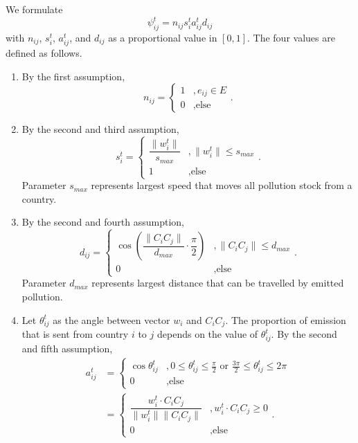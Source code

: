 \documentclass[a4paper,fleqn]{cas-dc}
\begin{document}
We formulate
\begin{equation}
    \psi_{ij}^t = n_{ij}s_i^t a_{ij}^t d_{ij}
\end{equation}
with $n_{ij}$, $s_i^t$, $a_{ij}^t$, and $d_{ij}$ as a proportional value in $[0,1]$. The four values are defined as follows.
\begin{enumerate}
    \item By the first assumption,
    \[n_{ij} = \begin{cases}
        1 &, e_{ij} \in E\\
        0 &, \text{else}
    \end{cases}.
    \]
    \item By the second and third assumption,
    \[s_i^t =
    \begin{cases}
        \dfrac{\lVert w_i^t \rVert}{s_{max}} & , \lVert w_i^t \rVert \leq s_{max} \\
        1 & , \text{else}
    \end{cases}.
    \]
    Parameter $s_{max}$ represents largest speed that moves all pollution stock from a country.

    \item By the second and fourth assumption,
    \[ d_{ij} =
    \begin{cases}
        \cos{\left(\dfrac{\lVert C_i C_j \rVert}{d_{max}} \cdot \dfrac{\pi}{2}\right)} & , \lVert C_i C_j \rVert \leq d_{max}\\
        0 & , \text{else}
    \end{cases}.
    \]
    Parameter $d_{max}$ represents largest distance that can be travelled by emitted pollution.

    \item Let $\theta_{ij}^t$ as the angle between vector $w_i$ and $C_iC_j$. The proportion of emission that is sent from country $i$ to $j$ depends on the value of $\theta_{ij}^t$. By the second and fifth assumption,
    \begin{align*}
    a_{ij}^t & =
    \begin{cases}
        \cos{\theta_{ij}^t} & , 0\leq \theta_{ij}^t \leq \frac{\pi}{2} \text{ or } \frac{3\pi}{2} \leq \theta_{ij}^t\leq 2\pi \\
        0 & , \text{else}
    \end{cases}
    \\
    & =
    \begin{cases}
        \dfrac{w_i^t\cdot C_iC_j}{\lVert w_i^t \rVert \lVert C_iC_j \rVert} & , w_i^t\cdot C_iC_j \geq 0\\
        0 & , \text{else}
    \end{cases}.
    \end{align*}
\end{enumerate}
\end{document}

